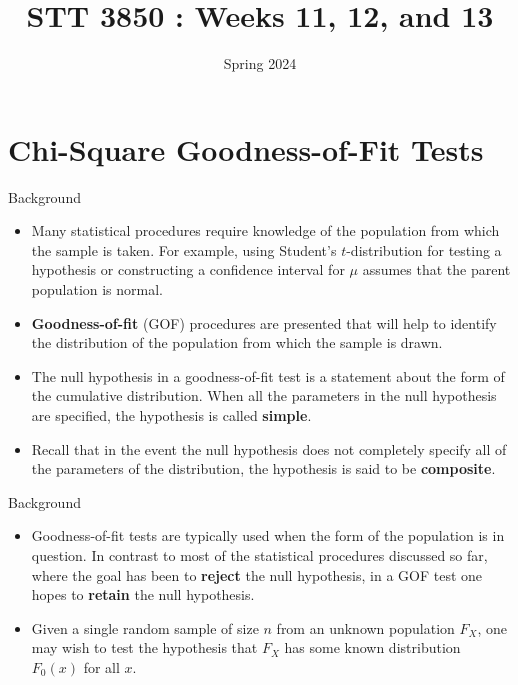 \documentclass[
  ignorenonframetext,
]{beamer}
\title{STT 3850 : Weeks 11, 12, and 13}
\author{Spring 2024}
\date{}
\institute{Appalachian State University}
\begin{document}
\frame{\titlepage}

\hypertarget{chi-square-goodness-of-fit-tests}{%
\section{Chi-Square Goodness-of-Fit
Tests}\label{chi-square-goodness-of-fit-tests}}

\begin{frame}{Background}
\protect\hypertarget{background}{}
\begin{itemize}
\item
  Many statistical procedures require knowledge of the population from
  which the sample is taken. For example, using Student's
  \(t\)-distribution for testing a hypothesis or constructing a
  confidence interval for \(\mu\) assumes that the parent population is
  normal.
\item
  \textbf{Goodness-of-fit} (GOF) procedures are presented that will help
  to identify the distribution of the population from which the sample
  is drawn.
\item
  The null hypothesis in a goodness-of-fit test is a statement about the
  form of the cumulative distribution. When all the parameters in the
  null hypothesis are specified, the hypothesis is called
  \textbf{simple}.
\item
  Recall that in the event the null hypothesis does not completely
  specify all of the parameters of the distribution, the hypothesis is
  said to be \textbf{composite}.
\end{itemize}
\end{frame}

\begin{frame}{Background}
\protect\hypertarget{background-1}{}
\begin{itemize}
\item
  Goodness-of-fit tests are typically used when the form of the
  population is in question. In contrast to most of the statistical
  procedures discussed so far, where the goal has been to
  \textbf{reject} the null hypothesis, in a GOF test one hopes to
  \textbf{retain} the null hypothesis.
\item
  Given a single random sample of size \(n\) from an unknown population
  \(F_X\), one may wish to test the hypothesis that \(F_X\) has some
  known distribution \(F_0(x)\) for all \(x\).
\end{itemize}
\end{frame}
\end{document}
